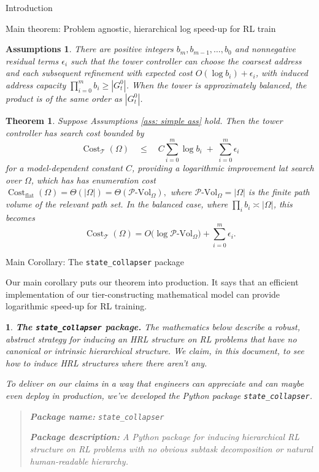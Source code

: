 \documentclass[11pt]{article}
\newtheorem{assumptions}[subsubsection]{Assumptions}
\newtheorem{ermark}[subsubsection]{}
\newtheorem{theorem}[subsubsection]{Theorem}
\newcommand{\PVol}{\mathcal{P}\text{-}\mathrm{Vol}}
\newcommand{\cost}{\operatorname{Cost}}
\begin{document}
\begin{section}{Introduction}
\begin{subsection}{Main theorem: Problem agnostic, hierarchical log speed-up for RL train}
\begin{assumptions}
There are positive integers \(b_m,b_{m-1},\ldots,b_0\) and nonnegative residual terms \(\epsilon_i\) such that the tower controller can choose the coarsest address and each subsequent refinement with expected cost
$O(\log b_i)+\epsilon_i$, with induced address capacity $\prod_{i=0}^{m} b_i \ge |G^{0}_{t}|$.
When the tower is approximately balanced, the product is of the same order as \(|G^{0}_{t}|\).
\end{assumptions}


\begin{theorem}\label{theorem: main}
Suppose Assumptions \ref{ass: simple ass} hold.  Then the tower controller has search cost bounded by
$$
    \cost_{\mathcal{T}}(\Omega)
    \quad\le\quad
    C\sum_{i=0}^{m}\log b_i \;+\; \sum_{i=0}^{m}\epsilon_i
$$
for a model-dependent constant \(C\), providing a logarithmic improvement lat search over \(\Omega\), which has has enumeration cost $
    \cost_{\mathrm{flat}}(\Omega)=\Theta(|\Omega|)=\Theta(\PVol_{\Omega}),
$
where \(\PVol_{\Omega}=|\Omega|\) is the finite path volume of the relevant path set.  In the balanced case, where \(\prod_i b_i\asymp |\Omega|\), this becomes
$$
    \cost_{\mathcal{T}}(\Omega)
    =O\bigl(\log \PVol_{\Omega}\bigr)+\sum_{i=0}^{m}\epsilon_i.
$$
\end{theorem}

\end{subsection}

\begin{subsection}{Main Corollary: The \texttt{state\_collapser} package}

Our main corollary puts our theorem into production. It says that an efficient implementation of our tier-constructing mathematical model can provide logarithmic speed-up for RL training.

\begin{ermark}
{\bf The \texttt{state\_collapser} package.}
\normalfont
The mathematics below describe a robust, abstract strategy for inducing an HRL structure on RL problems that have no canonical or intrinsic hierarchical structure. We claim, in this document, to see how to induce HRL structures where there aren't any.

To deliver on our claims in a way that engineers can appreciate and can maybe even deploy in production, we've developed the Python package \texttt{state\_collapser}.
\begin{quote}
{\sf
\textsf{\textbf{Package name:}} \texttt{state\_collapser}

\textsf{\textbf{Package description:}} A Python package for inducing hierarchical RL structure on RL problems with {\em no} obvious subtask decomposition or natural human-readable hierarchy.

}
\end{quote}
\end{ermark}
\end{subsection}
\end{section}
\end{document}
